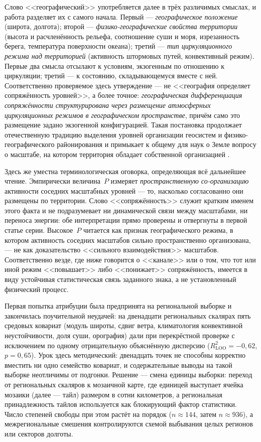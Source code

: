 \documentclass[11pt,a4paper]{article}
\begin{document}
Слово <<географический>> употребляется далее в трёх различимых смыслах, и работа разделяет их с самого начала. Первый --- \emph{географическое положение} (широта, долгота); второй --- \emph{физико-географические свойства территории} (высота и расчленённость рельефа, соотношение суши и моря, изрезанность берега, температура поверхности океана); третий --- \emph{тип циркуляционного режима над территорией} (активность штормовых путей, конвективный режим). Первые два смысла отсылают к условиям, экзогенным по отношению к циркуляции; третий --- к состоянию, складывающемуся вместе с ней. Соответственно проверяемое здесь утверждение --- не <<география определяет сопряжённость уровней>>, а более точное: \emph{географическая дифференциация сопряжённости структурирована через размещение атмосферных циркуляционных режимов в географическом пространстве}, причём само это размещение задано экзогенной конфигурацией. Такая постановка продолжает отечественную традицию выделения уровней организации геосистем и физико-географического районирования \cite{Sochava1978,Isachenko1991,Bertrand1968} и примыкает к общему для наук о Земле вопросу о масштабе, на котором территория обладает собственной организацией \cite{Simon1962,Levin1992,WuLoucks1995}.

Здесь же уместна терминологическая оговорка, определяющая всё дальнейшее чтение. Эмпирически величина~$P$ измеряет \emph{пространственную со-организацию} активности соседних масштабных уровней --- то, насколько согласованно они размещены по территории. Слово <<сопряжённость>> служит кратким именем этого факта и не подразумевает ни динамической связи между масштабами, ни переноса энергии: обе интерпретации прямо проверены и отвергнуты в первой статье серии. Высокое~$P$ читается как признак географического режима, в котором активность соседних масштабов сильно пространственно организована, --- не как доказательство <<сильного взаимодействия>> масштабов. Соответственно везде, где ниже говорится о <<канале>> или о том, что тот или иной режим <<повышает>> либо <<понижает>> сопряжённость, имеется в виду устойчивая статистическая связь заданного знака, а не установленный физический процесс.

Первая попытка атрибуции была предпринята на региональной выборке и закончилась поучительной неудачей: на двенадцати региональных скалярах пять средовых ковариат (модуль широты, сдвиг ветра, климатология конвективной неустойчивости, доля суши, орография) дали при перекрёстной проверке с исключением по одному отрицательную объяснённую дисперсию ($R^2_{\mathrm{LOO}}=-0{,}62$, $p=0{,}65$). Урок здесь методический: двенадцать точек не способны корректно вместить ни одно семейство ковариат, и содержательные выводы на такой выборке неотличимы от подгонки. Решение --- смена единицы выборки: переход от региональных скаляров к мозаичной карте, где единицей выступает ячейка мозаики (далее --- тайл) размером в сотни километров, а региональная принадлежность тайлов используется как блокирующий фактор статистики. Число степеней свободы при этом растёт на порядок ($n\approx144$, затем $n\approx936$), а межрегиональные смешения контролируются схемой выбывания целых регионов или секторов долготы.
\end{document}
